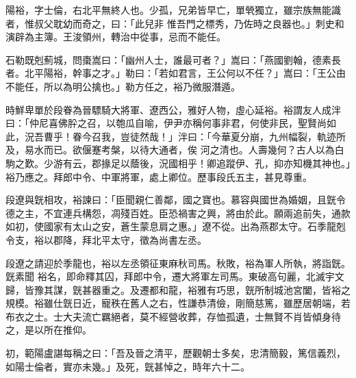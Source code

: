 \begin{pinyinscope}
 陽裕，字士倫，右北平無終人也。少孤，兄弟皆早亡，單煢獨立，雖宗族無能識者，惟叔父耽幼而奇之，曰：「此兒非
 惟吾門之標秀，乃佐時之良器也。」刺史和演辟為主簿。王浚領州，轉治中從事，忌而不能任。



 石勒既剋薊城，問棗嵩曰：「幽州人士，誰最可者？」嵩曰：「燕國劉翰，德素長者。北平陽裕，幹事之才。」勒曰：「若如君言，王公何以不任？」嵩曰：「王公由不能任，所以為明公擒也。」勒方任之，裕乃微服潛遁。



 時鮮卑單於段眷為晉驃騎大將軍、遼西公，雅好人物，虛心延裕。裕謂友人成泮曰：「仲尼喜佛肸之召，以匏瓜自喻，伊尹亦稱何事非君，何使非民，聖賢尚如此，況吾曹乎！眷今召我，豈徒然哉！」泮曰：「今華夏分崩，九州幅裂，軌迹所及，易水而已。欲偃蹇考槃，以待大通者，俟
 河之清也。人壽幾何？古人以為白駒之歎。少游有云，郡掾足以蔭後，況國相乎！卿追蹤伊、孔，抑亦知機其神也。」裕乃應之。拜郎中令、中軍將軍，處上卿位。歷事段氏五主，甚見尊重。



 段遼與皝相攻，裕諫曰：「臣聞親仁善鄰，國之寶也。慕容與國世為婚姻，且皝令德之主，不宜連兵構怨，凋殘百姓。臣恐禍害之興，將由於此。願兩追前失，通款如初，使國家有太山之安，蒼生蒙息肩之惠。」遼不從。出為燕郡太守。石季龍剋令支，裕以郡降，拜北平太守，徵為尚書左丞。



 段遼之請迎於季龍也，裕以左丞領征東麻秋司馬。秋敗，裕為軍人所執，將詣皝。皝素聞
 裕名，即命釋其囚，拜郎中令，遷大將軍左司馬。東破高句麗，北滅宇文歸，皆豫其謀，皝甚器重之。及遷都和龍，裕雅有巧思，皝所制城池宮闔，皆裕之規模。裕雖仕皝日近，寵秩在舊人之右，性謙恭清儉，剛簡慈篤，雖歷居朝端，若布衣之士。士大夫流亡羈絕者，莫不經營收葬，存恤孤遺，士無賢不肖皆傾身待之，是以所在推仰。



 初，範陽盧諶每稱之曰：「吾及晉之清平，歷觀朝士多矣，忠清簡毅，篤信義烈，如陽士倫者，實亦未幾。」及死，皝甚悼之，時年六十二。



\end{pinyinscope}
